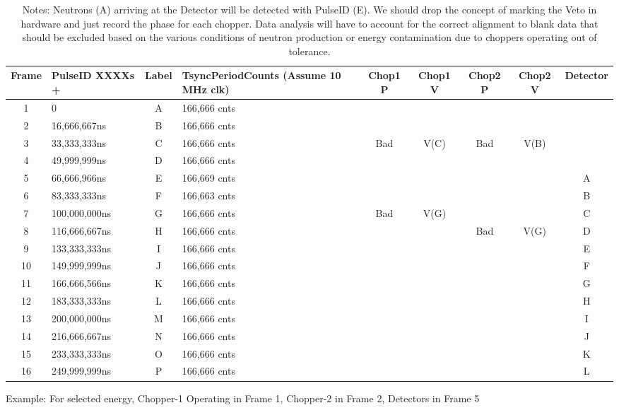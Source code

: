 \begin{table}[h]
  \begin{center}
    \begin{tabular}{c | p{2.5cm} | c | p{3.5cm} | c | c | c | c | c}
    Frame & PulseID XXXXs + & Label & TsyncPeriodCounts (Assume 10 MHz clk) & Chop1 P & Chop1 V & Chop2 P & Chop2 V & Detector \\
    \hline
    1 & 0 & A & 166,666 cnts & & & & & \\
    2 & 16,666,667ns & B & 166,666 cnts & & & & & \\
    3 & 33,333,333ns & C & 166,666 cnts & Bad & V(C) & Bad & V(B) & \\
    4 & 49,999,999ns & D & 166,666 cnts & & & & & \\
    5 & 66,666,966ns & E & 166,669 cnts & & & & & A \\
    6 & 83,333,333ns & F & 166,663 cnts & & & & & B \\
    7 & 100,000,000ns & G & 166,666 cnts & Bad & V(G) & & & C \\
    8 &116,666,667ns & H & 166,666 cnts &  & & Bad & V(G) & D \\
    9 & 133,333,333ns & I & 166,666 cnts & & & & & E \\
    10 & 149,999,999ns & J & 166,666 cnts & & & & &F\\
    11 & 166,666,566ns & K & 166,666 cnts & & & & &G\\
    12 & 183,333,333ns & L & 166,666 cnts & & & & &H\\
    13 & 200,000,000ns & M & 166,666 cnts & & & & &I\\
    14 & 216,666,667ns & N & 166,666 cnts & & & & &J\\
    15 & 233,333,333ns & O & 166,666 cnts & & & & &K\\
    16 & 249,999,999ns & P & 166,666 cnts & & & & &L\\
    \end{tabular}
  \end{center}
  \caption {Example: For selected energy, Chopper-1 Operating in Frame 1, Chopper-2 in Frame 2, Detectors in  Frame 5 }
  \caption* { Notes: Neutrons (A) arriving at the Detector will be detected with PulseID (E).  We should drop the concept of marking the Veto in hardware and just record the phase for each chopper.  Data analysis will have to account for the correct alignment to blank data that should be excluded based on the various conditions of neutron production or energy contamination due to choppers operating out of tolerance. }
  \label{table:Example}
\end{table}

\clearpage  %
